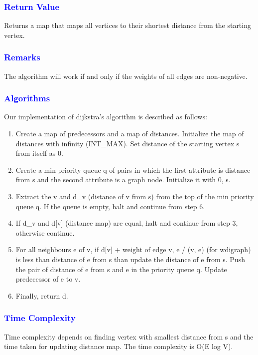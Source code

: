 \documentclass[11pt,a4paper]{article}
\begin{document}
\subsubsection*{\textcolor{blue}{ \large {Return Value}}}
Returns a map that maps all vertices to their shortest distance from the starting vertex.
\subsubsection*{\textcolor{blue}{ \large {Remarks}}}
The algorithm will work if and only if the weights of all edges are non-negative.
\subsubsection*{\textcolor{blue}{ \large {Algorithms}}}
Our implementation of dijkstra’s algorithm is described as follows:
\begin{enumerate}  
\item Create a map of predecessors and a map of distances. Initialize the map of distances with infinity (INT\_MAX). Set distance of the starting vertex s from itself as 0.
\item Create a min priority queue q of pairs in which the first attribute is distance from s and the second attribute is a graph node. Initialize it with {0, s}.

\item Extract the v and d\_v (distance of v from s)  from the top of the min priority queue q. If the queue is empty, halt and continue from step 6.
\item If d\_v and d[v] (distance map) are equal, halt and continue from step 3, otherwise continue.
\item For all neighbours e of v, if d[v] + weight of edge {v, e} / (v, e) (for wdigraph) is less than distance of e from s than update the distance of e from s. Push the pair of distance of e from s and e in the priority queue q. Update predecessor of e to v.
\item Finally, return d.

\end{enumerate}  
\subsubsection*{\textcolor{blue}{ \large {Time Complexity}}}
Time complexity depends on finding vertex with smallest distance from s and the time taken for updating distance map. The time complexity is O(E log V).
\end{document}
